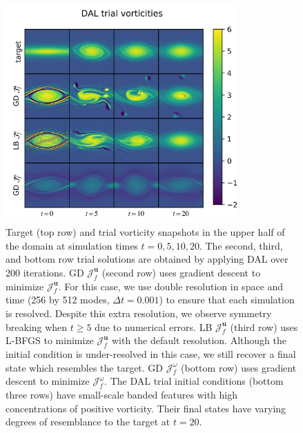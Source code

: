 \documentclass[%
 reprint,
 amsmath,amssymb,
 aps,
 pre,
]{revtex4-2}
\renewcommand{\vec}[1]{\boldsymbol{#1}}
\newcommand{\JUf}{\mathcal{J}^{\vec{u}}_f}
\newcommand{\Jwf}{\mathcal{J}^{\omega}_f}
\begin{document}
\begin{figure}
  \centering
  \includegraphics[width=3.5in]{Truesmolwrite000200.png}
  \caption{Target (top row) and trial vorticity snapshots in the upper half of the domain at simulation times $t=0,5,10,20$. 
  The second, third, and bottom row trial solutions are obtained by applying DAL over 200 iterations.
  GD $\JUf$ (second row) uses gradient descent to minimize $\JUf$. 
  For this case, we use double resolution in space and time (256 by 512 modes, $\Delta t=0.001$) to ensure that each simulation is resolved.
  Despite this extra resolution, we observe symmetry breaking when $t\geq 5$ due to numerical errors.
  LB $\JUf$ (third row) uses L-BFGS to minimize $\JUf$ with the default resolution.
  Although the initial condition is under-resolved in this case, we still recover a final state which resembles the target.
  GD $\Jwf$ (bottom row) uses gradient descent to minimize $\Jwf$. 
  The DAL trial initial conditions (bottom three rows) have small-scale banded features with high concentrations of positive vorticity.
  Their final states have varying degrees of resemblance to the target at $t=20$.
  }
  \label{snapshots200}
\end{figure}
\end{document}
